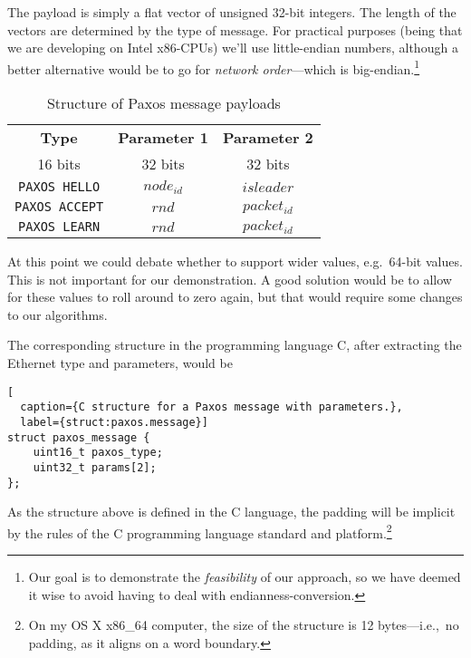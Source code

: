 The payload is simply a flat vector of unsigned 32-bit integers.  The length
of the vectors are determined by the type of message.  For practical
purposes (being that we are developing on Intel
    x86-CPUs) we'll use
little-endian numbers, although a better alternative would be to go for
\textit{network order}---which is big-endian.\footnote{Our goal is to
demonstrate the \textit{feasibility} of our approach, so we have deemed it
wise to avoid having to deal with endianness-conversion.}

\begin{table}[H]
  \centering
  \begin{tabular}{|c|c|c|}
    \hline \textbf{Type} & \textbf{Parameter 1} & \textbf{Parameter 2} \\
           16 bits & 32 bits & 32 bits \\
    \hline \texttt{PAXOS HELLO} & $node_{id}$ & $isleader$ \\
    \hline \texttt{PAXOS ACCEPT} & $rnd$ & $packet_{id}$ \\
    \hline \texttt{PAXOS LEARN} & $rnd$ & $packet_{id}$ \\
    \hline
  \end{tabular}
  \caption{Structure of Paxos message payloads}
  \label{table:paxos.payload.structure}
\end{table}

At this point we
could debate whether to support wider values, e.g.~64-bit values.
This is not important for our demonstration.  A good solution would be to
allow for these values to roll around to zero again, but that would require
some changes to our algorithms.

The corresponding structure in the programming language C, after extracting
the Ethernet type and parameters, would be

\begin{lstlisting}[
  caption={C structure for a Paxos message with parameters.},
  label={struct:paxos.message}]
struct paxos_message {
    uint16_t paxos_type;
    uint32_t params[2];
};
\end{lstlisting}

As the structure above is defined in the C language, the padding will be
implicit by the rules of the C programming language standard and
platform.\footnote{On my OS X x86\_{}64 computer, the size of the structure
is 12 bytes---i.e.,~no padding, as it aligns on a word boundary.}

